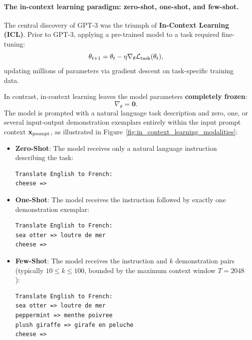\documentclass[../../main.tex]{subfiles}
\begin{document}
\paragraph{The in-context learning paradigm: zero-shot, one-shot, and few-shot.}
The central discovery of GPT-3 was the triumph of \textbf{In-Context Learning (ICL)}. 
Prior to GPT-3, applying a pre-trained model to a task required fine-tuning:
\begin{equation}
\label{eq:fine_tuning_update}
\theta_{t+1} = \theta_t - \eta \nabla_\theta \mathcal{L}_{\text{task}}(\theta_t),
\end{equation}
updating millions of parameters via gradient descent on task-specific training data.

In contrast, in-context learning leaves the model parameters \textbf{completely frozen}:
\begin{equation}
\label{eq:icl_frozen_weights}
\nabla_\theta = \mathbf{0}.
\end{equation}
The model is prompted with a natural language task description and zero, one, or several input-output demonstration exemplars entirely within the input prompt context $\mathbf{x}_{\text{prompt}}$, as illustrated in Figure~\ref{fig:in_context_learning_modalities}:
\begin{itemize}
    \item \textbf{Zero-Shot}: The model receives only a natural language instruction describing the task:
    \begin{lstlisting}[style=terminalOutput]
Translate English to French:
cheese =>
    \end{lstlisting}
    \item \textbf{One-Shot}: The model receives the instruction followed by exactly one demonstration exemplar:
    \begin{lstlisting}[style=terminalOutput]
Translate English to French:
sea otter => loutre de mer
cheese =>
    \end{lstlisting}
    \item \textbf{Few-Shot}: The model receives the instruction and $k$ demonstration pairs (typically $10 \le k \le 100$, bounded by the maximum context window $T = 2048$):
    \begin{lstlisting}[style=terminalOutput]
Translate English to French:
sea otter => loutre de mer
peppermint => menthe poivree
plush giraffe => girafe en peluche
cheese =>
    \end{lstlisting}
\end{itemize}
\end{document}
